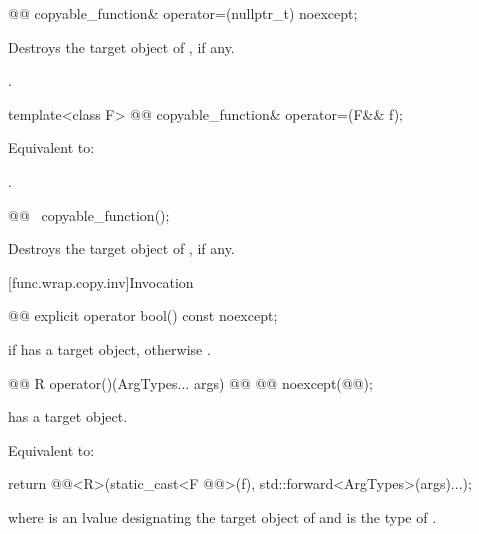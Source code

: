 %
\begin{itemdecl}
@@ copyable_function& operator=(nullptr_t) noexcept;
\end{itemdecl}

\begin{itemdescr}
\pnum
\effects
Destroys the target object of , if any.

\pnum
\returns
{}.
\end{itemdescr}

%
\begin{itemdecl}
template<class F> @@ copyable_function& operator=(F&& f);
\end{itemdecl}

\begin{itemdescr}
\pnum
\effects
Equivalent to: 

\pnum
\returns
{}.
\end{itemdescr}

%
\begin{itemdecl}
@@ ~copyable_function();
\end{itemdecl}

\begin{itemdescr}
\pnum
\effects
Destroys the target object of , if any.
\end{itemdescr}

[func.wrap.copy.inv]{Invocation}

%
\begin{itemdecl}
@@ explicit operator bool() const noexcept;
\end{itemdecl}

\begin{itemdescr}
\pnum
\returns
{} if  has a target object, otherwise .
\end{itemdescr}

%
\begin{itemdecl}
@@ R operator()(ArgTypes... args) @\cv{}@ @@ noexcept(@@);
\end{itemdecl}

\begin{itemdescr}
\pnum
\expects
{} has a target object.

\pnum
\effects
Equivalent to:
\begin{codeblock}
return @@<R>(static_cast<F @@>(f), std::forward<ArgTypes>(args)...);
\end{codeblock}
where  is an lvalue designating the target object of  and
 is the type of .
\end{itemdescr}

